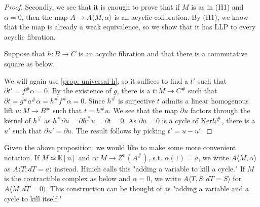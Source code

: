 \documentclass[../thesis.tex]{subfiles}
\begin{document}
\begin{proof}
                Secondly, we see that it is enough to prove that if $M$ is as in (H1) and $\alpha = 0$, then the map $A \rightarrow A\langle M,\alpha\rangle$ is an acyclic cofibration. By (H1), we know that the map is already a weak equivalence, so we show that it has LLP to every acyclic fibration.
                
                Suppose that $h: B \rightarrow C$ is an acyclic fibration and that there is a commutative square as below.
                \begin{center}
                \end{center}

                We will again use \ref{prop: universal-h}, so it suffices to find a $t'$ such that $\partial t' = f^\#\alpha = 0$. By the existence of $g$, there is a $t : M \rightarrow C^\#$ such that $\partial t = g^\#a^\#\alpha = h^\# f^\# \alpha = 0$. Since $h^\#$ is surjective $t$ admits a linear homogenous lift $u : M \rightarrow B^\#$ such that $t = h^\#u$. We see that the map $\partial u$ factors through the kernel of $h^\#$ as $h^\# \partial u = \partial h^\# u = \partial t = 0$. As $\partial u = 0$ is a cycle of $\tt{Ker}h^\#$, there is a $u'$ such that $\partial u' = \partial u$. The result follows by picking $t' = u - u'$.

            \end{proof}

            Given the above proposition, we would like to make some more convenient notation. If $M\simeq \mathbb{K}[n]$ and $\alpha: M \rightarrow Z^n(A^\#)$, s.t. $\alpha(1) = a$, we write $A\langle M,\alpha\rangle$ as $A\langle T; dT = a\rangle$ instead. Hinich calls this "adding a variable to kill a cycle." If $M$ is the contractible complex as below and $\alpha = 0$, we write $A\langle T, S; dT = S\rangle$ for $A\langle M; dT = 0 \rangle$. This construction can be thought of as "adding a variable and a cycle to kill itself."

            \begin{center}
            \end{center}
\end{document}
